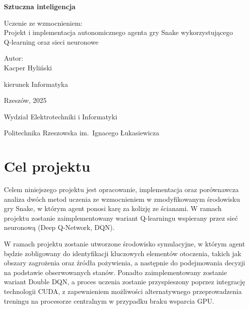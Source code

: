 \documentclass[a4paper,12pt]{article}
\begin{document}
\begin{titlepage}
  \thispagestyle{empty}
  \begin{center}
    {\LARGE\bfseries Sztuczna inteligencja\par}
    \vspace{1.5cm}

    {\large Uczenie ze wzmocnieniem:\\
    Projekt i implementacja autonomicznego agenta gry Snake wykorzystującego\\
    Q-learning oraz sieci neuronowe\par}
    \vspace{3cm}

    {\Large Autor:\\
    Kacper Hyliński\par}
    {\large kierunek Informatyka\par}
    \vfill

    {\large Rzeszów, 2025\par}
    \vspace{0.4cm}
    {\normalsize Wydział Elektrotechniki i Informatyki\par}
    {\normalsize Politechnika Rzeszowska im.\ Ignacego Łukasiewicza\par}
  \end{center}
\end{titlepage}
 
 \clearpage
  \thispagestyle{empty}
  \tableofcontents
  \clearpage

  \section{Cel projektu}
Celem niniejszego projektu jest opracowanie, implementacja oraz porównawcza analiza dwóch metod uczenia ze wzmocnieniem w zmodyfikowanym środowisku gry Snake, w którym agent ponosi karę za kolizję ze ścianami. W ramach projektu zostanie zaimplementowany wariant Q-learningu wspierany przez sieć neuronową (Deep Q-Network, DQN).

W ramach projektu zostanie utworzone środowisko symulacyjne, w którym agent będzie zobligowany do identyfikacji kluczowych elementów otoczenia, takich jak obszary zagrożenia oraz źródła pożywienia, a następnie do podejmowania decyzji na podstawie obserwowanych stanów. Ponadto zaimplementowany zostanie wariant Double DQN, a proces uczenia zostanie przyspieszony poprzez integrację technologii CUDA, z zapewnieniem możliwości alternatywnego przeprowadzenia treningu na procesorze centralnym w przypadku braku wsparcia GPU.
\end{document}
